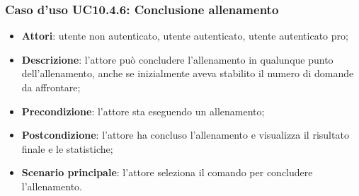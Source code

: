 \subsubsection{Caso d'uso UC10.4.6: Conclusione allenamento}
	\begin{itemize}
		\item \textbf{Attori}: utente non autenticato, utente autenticato, utente autenticato pro;
		\item \textbf{Descrizione}: l'attore può concludere l'allenamento in qualunque punto dell'allenamento, anche se inizialmente aveva stabilito il numero di domande da affrontare;
		\item \textbf{Precondizione}: l'attore sta eseguendo un allenamento;
		\item \textbf{Postcondizione}: l'attore ha concluso l'allenamento e visualizza il risultato finale e le statistiche;
		\item \textbf{Scenario principale}: l'attore seleziona il comando per concludere l'allenamento.
	\end{itemize}